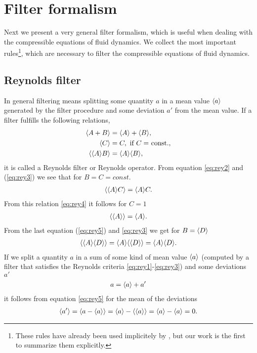 \chapter{Filter formalism}\label{filter}
Next we present a very general filter formalism, which
is useful when dealing with the compressible equations of fluid dynamics. We
collect the most important rules\footnote{These rules have already been used
implicitely by \citet{Canuto1997,Schmidt2006}, but our work is the first to 
summarize them explicitly.}, which are necessary to filter the compressible
equations of fluid dynamics. 

\section{Reynolds filter}
In general filtering means splitting some quantity $a$ in a mean value $\langle a \rangle$
generated by the filter procedure and some deviation $a'$ from the mean value.
If a filter fulfills the following relations,
\begin{align}
\langle A + B \rangle &= \langle A \rangle+\langle B \rangle,\label{eq:rey1} \\
\langle C \rangle &= C,\ \text{if $C = $\ const.}, \label{eq:rey2}\\
\langle \langle A \rangle B \rangle &= \langle A \rangle \langle B \rangle, \label{eq:rey3}
\end{align}
it is called a Reynolds filter or Reynolds operator. From equation
\eqref{eq:rey2} and
(\ref{eq:rey3}) we see that for $B=C=const.$ 
\begin{align}
\langle \langle A \rangle C \rangle = \langle A \rangle C. \label{eq:rey4}
\end{align}
From this relation \eqref{eq:rey4} it follows for $C=1$
\begin{align}
\langle \langle A \rangle \rangle=\langle A \rangle. \label{eq:rey5}
\end{align}
From the last equation (\eqref{eq:rey5}) and \eqref{eq:rey3} we get
for $B=\langle D \rangle$
\begin{align}
\langle \langle A \rangle\langle D \rangle \rangle = \langle A \rangle\langle \langle D \rangle \rangle=\langle A \rangle\langle D \rangle.
\end{align}
If we split a quantity $a$ in a sum of some kind of mean value $\langle a \rangle$
(computed by a filter
that satisfies the Reynolds criteria \eqref{eq:rey1}-\eqref{eq:rey3}) and some
deviations $a'$
\begin{align}
a=\langle a \rangle+a'
\end{align}
it follows from equation \eqref{eq:rey5} for the mean of the deviations
\begin{align}
\langle a' \rangle=\langle a-\langle a \rangle \rangle=\langle a \rangle-\langle \langle a \rangle \rangle=\langle a \rangle-\langle a \rangle=0.
\label{eq:meandev}
\end{align}
